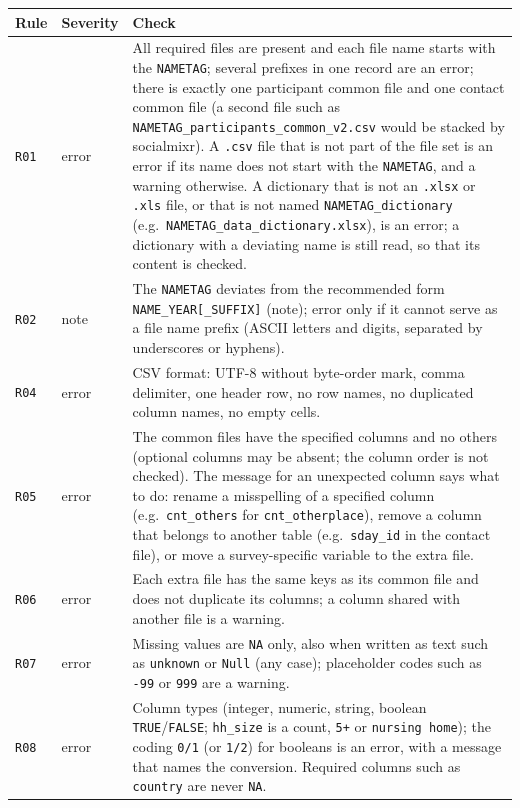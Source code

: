 \documentclass[11pt,a4paper]{article}
\begin{document}
{\small
\begin{longtable}{p{1.1cm} p{1.7cm} p{11.9cm}}
\toprule
\textbf{Rule} & \textbf{Severity} & \textbf{Check} \\
\midrule
\endhead
\texttt{R01} & error & All required files are present and each file name starts with the \texttt{NAMETAG}; several prefixes in one record are an error; there is exactly one participant common file and one contact common file (a second file such as \texttt{NAMETAG\_participants\_common\_v2.csv} would be stacked by socialmixr). A \texttt{.csv} file that is not part of the file set is an error if its name does not start with the \texttt{NAMETAG}, and a warning otherwise. A dictionary that is not an \texttt{.xlsx} or \texttt{.xls} file, or that is not named \texttt{NAMETAG\_dictionary} (e.g.\ \texttt{NAMETAG\_data\_dictionary.xlsx}), is an error; a dictionary with a deviating name is still read, so that its content is checked. \\
\texttt{R02} & note & The \texttt{NAMETAG} deviates from the recommended form \texttt{NAME\_YEAR[\_SUFFIX]} (note); error only if it cannot serve as a file name prefix (ASCII letters and digits, separated by underscores or hyphens). \\
\texttt{R04} & error & CSV format: UTF-8 without byte-order mark, comma delimiter, one header row, no row names, no duplicated column names, no empty cells. \\
\texttt{R05} & error & The common files have the specified columns and no others (optional columns may be absent; the column order is not checked). The message for an unexpected column says what to do: rename a misspelling of a specified column (e.g.\ \texttt{cnt\_others} for \texttt{cnt\_otherplace}), remove a column that belongs to another table (e.g.\ \texttt{sday\_id} in the contact file), or move a survey-specific variable to the extra file. \\
\texttt{R06} & error & Each extra file has the same keys as its common file and does not duplicate its columns; a column shared with another file is a warning. \\
\texttt{R07} & error & Missing values are \texttt{NA} only, also when written as text such as \texttt{unknown} or \texttt{Null} (any case); placeholder codes such as \texttt{-99} or \texttt{999} are a warning. \\
\texttt{R08} & error & Column types (integer, numeric, string, boolean \texttt{TRUE}/\texttt{FALSE}; \texttt{hh\_size} is a count, \texttt{5+} or \texttt{nursing home}); the coding \texttt{0/1} (or \texttt{1/2}) for booleans is an error, with a message that names the conversion. Required columns such as \texttt{country} are never \texttt{NA}. \\

\end{longtable}}
\end{document}
